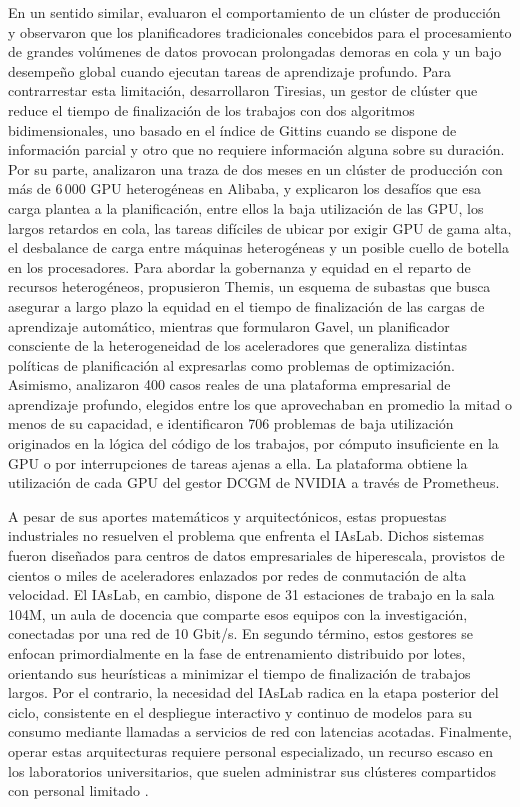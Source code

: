 En un sentido similar, \citet{gu-tiresias-2019} evaluaron el comportamiento de un clúster de producción y observaron que los planificadores tradicionales concebidos para el procesamiento de grandes volúmenes de datos provocan prolongadas demoras en cola y un bajo desempeño global cuando ejecutan tareas de aprendizaje profundo. Para contrarrestar esta limitación, desarrollaron Tiresias, un gestor de clúster que reduce el tiempo de finalización de los trabajos con dos algoritmos bidimensionales, uno basado en el índice de Gittins cuando se dispone de información parcial y otro que no requiere información alguna sobre su duración. Por su parte, \citet{weng-mlaasinthewild-2022} analizaron una traza de dos meses en un clúster de producción con más de 6\,000 GPU heterogéneas en Alibaba, y explicaron los desafíos que esa carga plantea a la planificación, entre ellos la baja utilización de las GPU, los largos retardos en cola, las tareas difíciles de ubicar por exigir GPU de gama alta, el desbalance de carga entre máquinas heterogéneas y un posible cuello de botella en los procesadores. Para abordar la gobernanza y equidad en el reparto de recursos heterogéneos, \citet{mahajan-themis-2020} propusieron Themis, un esquema de subastas que busca asegurar a largo plazo la equidad en el tiempo de finalización de las cargas de aprendizaje automático, mientras que \citet{narayanan-gavel-2020} formularon Gavel, un planificador consciente de la heterogeneidad de los aceleradores que generaliza distintas políticas de planificación al expresarlas como problemas de optimización. Asimismo, \citet{gao-lowgpuutilization-2024} analizaron 400 casos reales de una plataforma empresarial de aprendizaje profundo, elegidos entre los que aprovechaban en promedio la mitad o menos de su capacidad, e identificaron 706 problemas de baja utilización originados en la lógica del código de los trabajos, por cómputo insuficiente en la GPU o por interrupciones de tareas ajenas a ella. La plataforma obtiene la utilización de cada GPU del gestor DCGM de NVIDIA a través de Prometheus.

A pesar de sus aportes matemáticos y arquitectónicos, estas propuestas industriales no resuelven el problema que enfrenta el IAsLab. Dichos sistemas fueron diseñados para centros de datos empresariales de hiperescala, provistos de cientos o miles de aceleradores enlazados por redes de conmutación de alta velocidad. El IAsLab, en cambio, dispone de 31 estaciones de trabajo en la sala 104M, un aula de docencia que comparte esos equipos con la investigación, conectadas por una red de 10 Gbit/s. En segundo término, estos gestores se enfocan primordialmente en la fase de entrenamiento distribuido por lotes, orientando sus heurísticas a minimizar el tiempo de finalización de trabajos largos. Por el contrario, la necesidad del IAsLab radica en la etapa posterior del ciclo, consistente en el despliegue interactivo y continuo de modelos para su consumo mediante llamadas a servicios de red con latencias acotadas. Finalmente, operar estas arquitecturas requiere personal especializado, un recurso escaso en los laboratorios universitarios, que suelen administrar sus clústeres compartidos con personal limitado \citep{xu-sing-2025}.

